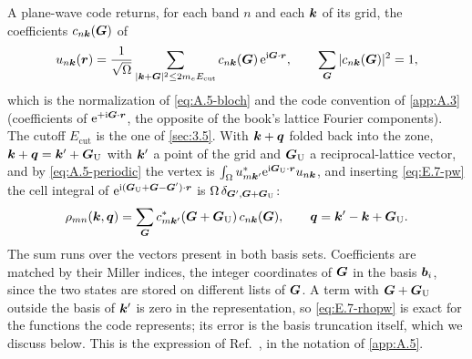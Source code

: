 A plane-wave code returns, for each band $n$ and each $\bm{k}$ of its grid, the coefficients $c_{n\bm{k}}(\bm{G})$ of
\begin{equation}
  u_{n\bm{k}}(\bm{r}) = \frac{1}{\sqrt\Omega}\sum_{|\bm{k}+\bm{G}|^2\le 2m_eE_{\mathrm{cut}}} c_{n\bm{k}}(\bm{G})\,\mathrm{e}^{\mathrm{i}\bm{G}\cdot\bm{r}}, \qquad \sum_{\bm{G}}|c_{n\bm{k}}(\bm{G})|^2 = 1 ,
  \label{eq:E.7-pw}
\end{equation}
which is the normalization of \cref{eq:A.5-bloch} and the code convention of \cref{app:A.3} (coefficients of $\mathrm{e}^{+\mathrm{i}\bm{G}\cdot\bm{r}}$, the opposite of the book's lattice Fourier components). The cutoff $E_{\mathrm{cut}}$ is the one of \cref{sec:3.5}. With $\bm{k}+\bm{q}$ folded back into the zone, $\bm{k}+\bm{q} = \bm{k}' + \bm{G}_{\mathrm{U}}$ with $\bm{k}'$ a point of the grid and $\bm{G}_{\mathrm{U}}$ a reciprocal-lattice vector, and by \cref{eq:A.5-periodic} the vertex is $\int_\Omega u^*_{m\bm{k}'}\mathrm{e}^{\mathrm{i}\bm{G}_{\mathrm{U}}\cdot\bm{r}}u_{n\bm{k}}$, and inserting \cref{eq:E.7-pw} the cell integral of $\mathrm{e}^{\mathrm{i}(\bm{G}_{\mathrm{U}} + \bm{G} - \bm{G}')\cdot\bm{r}}$ is $\Omega\,\delta_{\bm{G}',\bm{G}+\bm{G}_{\mathrm{U}}}$:
\begin{equation}
  \rho_{mn}(\bm{k},\bm{q}) = \sum_{\bm{G}} c^*_{m\bm{k}'}(\bm{G} + \bm{G}_{\mathrm{U}})\,c_{n\bm{k}}(\bm{G}), \qquad \bm{q} = \bm{k}' - \bm{k} + \bm{G}_{\mathrm{U}} .
  \label{eq:E.7-rhopw}
\end{equation}
The sum runs over the vectors present in both basis sets. Coefficients are matched by their Miller indices, the integer coordinates of $\bm{G}$ in the basis $\bm{b}_i$, since the two states are stored on different lists of $\bm{G}$. A term with $\bm{G}+\bm{G}_{\mathrm{U}}$ outside the basis of $\bm{k}'$ is zero in the representation, so \cref{eq:E.7-rhopw} is exact for the functions the code represents; its error is the basis truncation itself, which we discuss below. This is the expression of Ref.~\cite[Eq.~(3.16)]{essig2016direct}, in the notation of \cref{app:A.5}.

